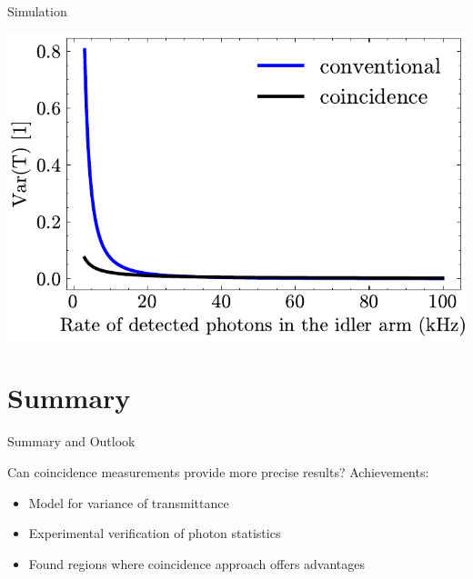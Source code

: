 \documentclass[10pt,aspectratio=43]{beamer}
\begin{document}
	
	\begin{frame}{Simulation}
		\begin{minipage}{.55\textwidth}
			\centering
			\includegraphics[width=\textwidth]{Images/SimulationSweepRateIdl_2}
		\end{minipage}
		\hfill
		\begin{minipage}{.35\textwidth}
		\end{minipage}
	\end{frame}
	
	\section{Summary}
	
	\begin{frame}{Summary and Outlook}
		\begin{block}{Can coincidence measurements provide more precise results?}
			Achievements:
			\begin{itemize}
				\item Model for variance of transmittance
				\item Experimental verification of photon statistics
				\item Found regions where coincidence approach offers advantages
			\end{itemize}
		\end{block}
		
	\end{frame}
	
\end{document}
